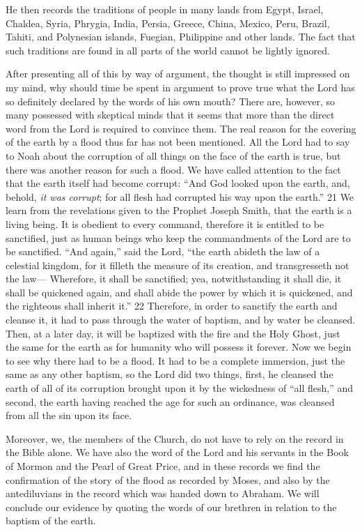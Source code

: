 He then records the traditions of people in many lands from Egypt, Israel, Chaldea, Syria,
Phrygia, India, Persia, Greece, China, Mexico, Peru, Brazil, Tahiti, and Polynesian islands,
Fuegian, Philippine and other lands. The fact that such traditions are found in all parts of the
world cannot be lightly ignored.

After presenting all of this by way of argument, the thought is still impressed on my mind,
why should time be spent in argument to prove true what the Lord has so definitely declared
by the words of his own mouth? There are, however, so many possessed with skeptical minds
that it seems that more than the direct word from the Lord is required to convince them. The
real reason for the covering of the earth by a flood thus far has not been mentioned. All the
Lord had to say to Noah about the corruption of all things on the face of the earth is true, but
there was another reason for such a flood. We have called attention to the fact that the earth
itself had become corrupt: ``And God looked upon the earth, and, behold, \textit{it was corrupt}; for
all flesh had corrupted his way upon the earth.'' 21 We learn from the revelations given to the
Prophet Joseph Smith, that the earth is a living being. It is obedient to every command,
therefore it is entitled to be sanctified, just as human beings who keep the commandments of
the Lord are to be sanctified. ``And again,'' said the Lord, ``the earth abideth the law of a
celestial kingdom, for it filleth the measure of its creation, and transgresseth not the law—
Wherefore, it shall be sanctified; yea, notwithstanding it shall die, it shall be quickened again,
and shall abide the power by which it is quickened, and the righteous shall inherit it.'' 22
Therefore, in order to sanctify the earth and cleanse it, it had to pass through the water of
baptism, and by water be cleansed. Then, at a later day, it will be baptized with the fire and
the Holy Ghost, just the same for the earth as for humanity who will possess it forever. Now
we begin to see why there had to be a flood. It had to be a complete immersion, just the same
as any other baptism, so the Lord did two things, first, he cleansed the earth of all of its
corruption brought upon it by the wickedness of ``all flesh,'' and second, the earth having
reached the age for such an ordinance, was cleansed from all the sin upon its face.

Moreover, we, the members of the Church, do not have to rely on the record in the Bible
alone. We have also the word of the Lord and his servants in the Book of Mormon and the
Pearl of Great Price, and in these records we find the confirmation of the story of the flood as
recorded by Moses, and also by the antediluvians in the record which was handed down to
Abraham. We will conclude our evidence by quoting the words of our brethren in relation to
the baptism of the earth.

